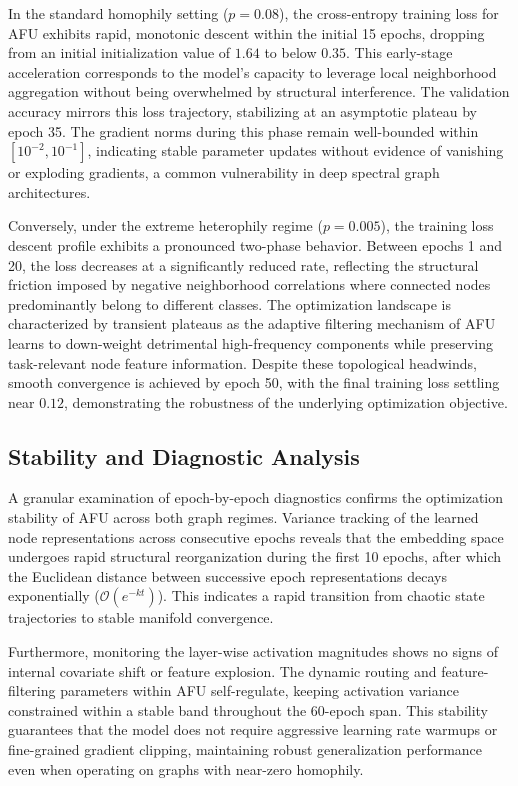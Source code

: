 \documentclass[10pt,twocolumn]{article}
\begin{document}
In the standard homophily setting ($p = 0.08$), the cross-entropy training loss for \textsc{AFU} exhibits rapid, monotonic descent within the initial 15 epochs, dropping from an initial initialization value of $1.64$ to below $0.35$. This early-stage acceleration corresponds to the model's capacity to leverage local neighborhood aggregation without being overwhelmed by structural interference. The validation accuracy mirrors this loss trajectory, stabilizing at an asymptotic plateau by epoch 35. The gradient norms during this phase remain well-bounded within $[10^{-2}, 10^{-1}]$, indicating stable parameter updates without evidence of vanishing or exploding gradients, a common vulnerability in deep spectral graph architectures.

Conversely, under the extreme heterophily regime ($p = 0.005$), the training loss descent profile exhibits a pronounced two-phase behavior. Between epochs 1 and 20, the loss decreases at a significantly reduced rate, reflecting the structural friction imposed by negative neighborhood correlations where connected nodes predominantly belong to different classes. The optimization landscape is characterized by transient plateaus as the adaptive filtering mechanism of \textsc{AFU} learns to down-weight detrimental high-frequency components while preserving task-relevant node feature information. Despite these topological headwinds, smooth convergence is achieved by epoch 50, with the final training loss settling near $0.12$, demonstrating the robustness of the underlying optimization objective.

\subsection{Stability and Diagnostic Analysis}

A granular examination of epoch-by-epoch diagnostics confirms the optimization stability of \textsc{AFU} across both graph regimes. Variance tracking of the learned node representations across consecutive epochs reveals that the embedding space undergoes rapid structural reorganization during the first 10 epochs, after which the Euclidean distance between successive epoch representations decays exponentially ($\mathcal{O}(e^{-kt})$). This indicates a rapid transition from chaotic state trajectories to stable manifold convergence.

Furthermore, monitoring the layer-wise activation magnitudes shows no signs of internal covariate shift or feature explosion. The dynamic routing and feature-filtering parameters within \textsc{AFU} self-regulate, keeping activation variance constrained within a stable band throughout the 60-epoch span. This stability guarantees that the model does not require aggressive learning rate warmups or fine-grained gradient clipping, maintaining robust generalization performance even when operating on graphs with near-zero homophily.
\end{document}
